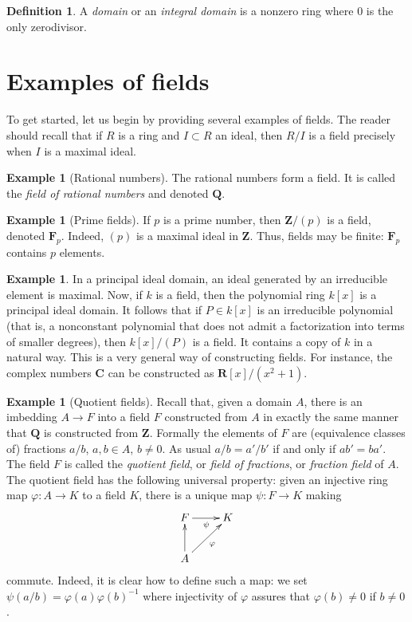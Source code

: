 \documentclass{stacks-project}
\theoremstyle{plain}
\theoremstyle{definition}
\newtheorem{definition}[subsection]{Definition}
\newtheorem{example}[subsection]{Example}
\theoremstyle{remark}
\numberwithin{equation}{subsection}
\begin{document}
\begin{definition}
\label{definition-domain}
A {\it domain} or an {\it integral domain} is a nonzero ring where $0$
is the only zerodivisor.
\end{definition}



\section{Examples of fields}
\label{section-examples}

\noindent
To get started, let us begin by providing several examples of fields. The
reader should recall that if $R$ is a ring and $I \subset R$ an
ideal, then $R/I$ is a field precisely when $I$ is a maximal ideal.

\begin{example}[Rational numbers]
\label{example-rational-numbers}
The rational numbers form a field. It is called the
{\it field of rational numbers} and denoted $\mathbf{Q}$.
\end{example}

\begin{example}[Prime fields]
\label{example-prime-field}
If $p$ is a prime number, then $\mathbf{Z}/(p)$ is a field, denoted
$\mathbf{F}_p$. Indeed, $(p)$ is a
maximal ideal in $\mathbf{Z}$. Thus, fields may be finite: $\mathbf{F}_p$
contains $p$ elements.
\end{example}

\begin{example}
\label{example-quotient-polymial-ring}
In a principal ideal domain, an ideal generated by an irreducible element
is maximal. Now, if $k$ is a field, then the polynomial ring $k[x]$ is a
principal ideal domain. It follows that if $P \in k[x]$ is an irreducible
polynomial (that is, a nonconstant polynomial
that does not admit a factorization into terms of smaller degrees), then
$k[x]/(P)$ is a field. It contains a copy of $k$ in a natural way.
This is a very general way of constructing fields. For instance, the
complex numbers $\mathbf{C}$
can be constructed as $\mathbf{R}[x]/(x^2 + 1)$.
\end{example}

\begin{example}[Quotient fields]
\label{example-quotient-field}
Recall that, given a domain $A$, there is an imbedding $A \to F$ into a
field $F$ constructed from $A$ in exactly the same manner that
$\mathbf{Q}$ is constructed from $\mathbf{Z}$. Formally the elements
of $F$ are (equivalence classes of) fractions $a/b$,
$a, b \in A$, $b \not = 0$. As usual $a/b = a'/b'$ if and only if $ab' = ba'$.
The field $F$ is called the {\it quotient field}, or {\it field of fractions},
or {\it fraction field} of $A$.
The quotient field has the following universal property: given an
injective ring map $\varphi : A \to K$ to a field $K$, there is a unique
map $\psi : F \to K$ making
$$
\xymatrix{
F \ar[r]_\psi & K \\
A \ar[u] \ar[ru]_\varphi
}
$$
commute. Indeed, it is clear how to define such a map: we set
$\psi(a/b) = \varphi(a)\varphi(b)^{-1}$ where injectivity of $\varphi$
assures that $\varphi(b) \not = 0$ if $ b \not = 0$.
\end{example}
\end{document}

